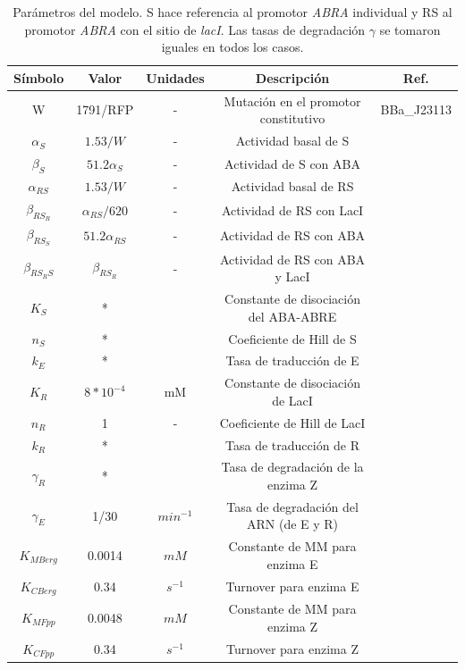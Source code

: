 \documentclass[12pt]{article}
\begin{document}
\begin{table}[H]
\centering
\begin{tabular}{c c c c c} 
 \hline
 S\'imbolo & Valor & Unidades & Descripci\'on & Ref. \\
 \hline\hline
 W & 1791/RFP & - & Mutaci\'on en el promotor constitutivo & BBa\_J23113 \\
 $\alpha_S$ & $1.53/W$ & - & Actividad basal de S & \cite{kelly09}  \\ 
 $\beta_S$ & $51.2 \alpha_S$ & - &  Actividad de S con ABA & \cite{hobo99} \\
 $\alpha_{RS}$ & $1.53/W$ & - & Actividad basal de RS & \cite{kelly09} \\
 $\beta_{RS_R}$ & $\alpha_{RS}/620$ & - & Actividad de RS con LacI & \cite{lutz97}\\
 $\beta_{RS_S}$ & $51.2 \alpha_{RS}$ & - & Actividad de  RS con ABA & \cite{hobo99} \\
 $\beta_{RS_RS}$ & $\beta_{RS_R}$ & - & Actividad de RS con ABA y LacI & \cite{lutz97} \\
 $K_S$ & * &  & Constante de disociaci\'on del ABA-ABRE &  \\
 $n_S$ & * &  & Coeficiente de Hill de S & \\
 $k_E$ & * &  & Tasa de traducci\'on de E &   \\
 $K_R$ & $8*10^{-4}$ & mM & Constante de disociaci\'on de LacI & \cite{basu05} \\
 $n_R$ & 1 & - & Coeficiente de Hill de LacI & \cite{kalisky07}\\
 $k_R$ & * & & Tasa de traducci\'on de R & \\
 $\gamma_R$ & * & & Tasa de degradaci\'on de la enzima Z & \\
 $\gamma_E$ & 1/30 & $min^{-1}$ & Tasa de degradaci\'on del ARN (de E y R) & \\
 $K_{MBerg}$ & 0.0014 & $mM$ & Constante de MM para enzima E & \cite{jones11} \\
 $K_{CBerg}$ & 0.34 & $s^{-1}$ & Turnover para enzima E & \cite{jones11} \\
 $K_{MFpp}$ & 0.0048 & $mM$ & Constante de MM para enzima Z & \cite{kittleman07} \\
 $K_{CFpp}$ & 0.34 & $s^{-1}$ & Turnover para enzima Z & \cite{kittleman07} \\
 \hline
\end{tabular}
\caption{Par\'ametros del modelo. S hace referencia al promotor \emph{ABRA} individual y RS al promotor \emph{ABRA} con el sitio de \emph{lacI}. Las tasas de degradaci\'on $\gamma$ se tomaron iguales en todos los casos.}
\label{tab:1}
\end{table}
\end{document}
